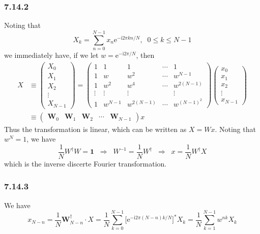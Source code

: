 \documentclass[]{ctexart}
\begin{document}
\subsubsection*{7.14.2}
Noting that 
\begin{equation*}
X_k=\sum_{n=0}^{N-1}x_n\mathrm{e}^{-\mathrm{i}2\pi kn/N},\;\;0\le k\le N-1
\end{equation*}
we immediately have, if we let $w=\mathrm{e}^{-\mathrm{i}2\pi/N}$, then 
\begin{align*}
X&\equiv \begin{pmatrix}
X_0\\X_1\\X_2\\\vdots\\X_{N-1}
\end{pmatrix}=\begin{pmatrix}
1 & 1 & 1 & \cdots & 1\\ 
1 & w & w^2 & \cdots & w^{N-1}\\
1 & w^2 & w ^4 & \cdots & w^{2(N-1)}\\
\vdots & \vdots & \vdots & \; & \vdots\\
1 & w^{N-1} & w^{2(N-1)} & \cdots & w^{(N-1)^2}
\end{pmatrix}\begin{pmatrix}
x_0\\x_1\\x_2\\\vdots\\x_{N-1}
\end{pmatrix}\\&\equiv\begin{pmatrix}
\mathbf W_{0} & \mathbf W_{1} & \mathbf{W}_2 & \cdots & \mathbf W_{N-1}
\end{pmatrix}x
\end{align*}
Thus the transformation is linear, which can be written as $X=Wx$. Noting that $w^N=1$, we have 
\begin{equation*}
\frac{1}{N}W^\dagger W=\mathbf 1\;\;\Rightarrow\;\;W^{-1}=\frac{1}{N}W^\dagger\;\;\Rightarrow\;\;x=\frac{1}{N}W^\dagger X
\end{equation*}
which is the inverse discerte Fourier transformation. 
\subsubsection*{7.14.3}
We have 
\begin{equation*}
x_{N-n}=\frac{1}{N}\mathbf W_{N-n}^\dagger\cdot X=\frac{1}{N}\sum_{k=0}^{N-1}\big[\mathrm{e}^{-\mathrm{i}2\pi(N-n)k/N}\big]^*X_k=\frac{1}{N}\sum_{k=1}^{N-1}w^{nk}X_k
\end{equation*}
\end{document}
